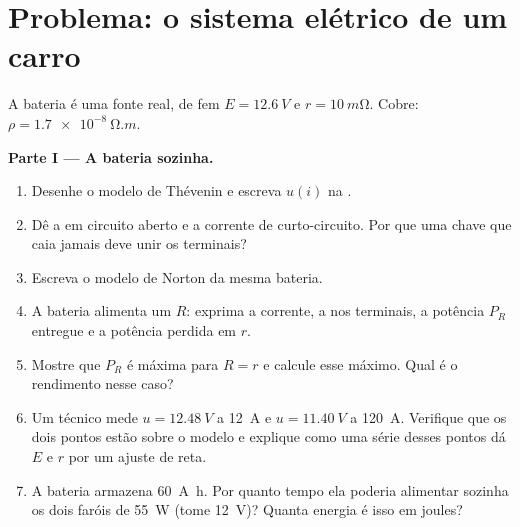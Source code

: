 \section{Problema: o sistema elétrico de um carro}

\begin{problem}
\label{pb:b1:dc-circuits:1}
A bateria é uma fonte real, de fem $E = \qty{12.6}{V}$ e  $r = \qty{10}{m\ohm}$. Cobre: $\rho = \qty{1.7e-8}{\ohm.m}$.

\medskip
\noindent\textbf{Parte I --- A bateria sozinha.}
\begin{enumerate}
  \item Desenhe o modelo de Thévenin e escreva $u(i)$ na .
  \item Dê a  em circuito aberto e a corrente de curto-circuito.
        Por que uma chave que caia jamais deve unir os terminais?
  \item Escreva o modelo de Norton da mesma bateria.
  \item A bateria alimenta um  $R$: exprima a corrente, a
         nos terminais, a potência $P_R$ entregue e a potência perdida
        em $r$.
  \item Mostre que $P_R$ é máxima para $R = r$ e calcule esse
        máximo. Qual é o rendimento nesse caso?
  \item Um técnico mede $u = \qty{12.48}{V}$ a \qty{12}{A} e
        $u = \qty{11.40}{V}$ a \qty{120}{A}. Verifique que os dois pontos estão
        sobre o modelo e explique como uma série desses pontos dá $E$
        e $r$ por um ajuste de reta.
  \item A bateria armazena \qty{60}{A.h}. Por quanto tempo ela poderia alimentar
        sozinha os dois faróis de \qty{55}{W} (tome \qty{12}{V})? Quanta
        energia é isso em joules?
\end{enumerate}


\end{problem}
